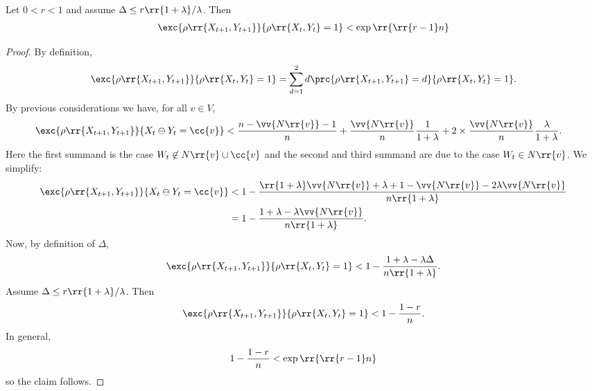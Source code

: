 \documentclass{article}
\begin{document}
\begin{claim*}[4]
  Let $0<r<1$ and assume $\Delta \leq r\rr{1+\lambda}/\lambda$. Then
  \begin{align*}
    \exc{\rho\rr{X_{t+1},Y_{t+1}}}{\rho\rr{X_t,Y_t}=1} < \exp\rr{\rr{r-1}n}
  \end{align*}
  \begin{proof}
    By definition,
    \begin{align*}
      \exc{\rho\rr{X_{t+1},Y_{t+1}}}{\rho\rr{X_t,Y_t}=1} = \sum_{d=1}^{2} d\prc{\rho\rr{X_{t+1},Y_{t+1}}=d}{\rho\rr{X_t,Y_t}=1}.
    \end{align*}
    By previous considerations we have, for all $v\in V$,
    \begin{align*}
      \exc{\rho\rr{X_{t+1},Y_{t+1}}}{X_t\ominus Y_t=\cc{v}}
      &< \frac{n-\vv{N\rr{v}}-1}{n}
      + \frac{\vv{N\rr{v}}}{n}\frac{1}{1+\lambda}
      + 2\times\frac{\vv{N\rr{v}}}{n} \frac{\lambda}{1+\lambda}.
    \end{align*}
    Here the first summand is the case $W_t\not\in N\rr{v}\cup \cc{v}$ and the second and third summand are
    due to the case $W_t\in N\rr{v}$. We simplify:
    \begin{align*}
      \exc{\rho\rr{X_{t+1},Y_{t+1}}}{X_t\ominus Y_t=\cc{v}}
      &< 1 - \frac{\rr{1+\lambda}\vv{N\rr{v}}+\lambda + 1 - \vv{N\rr{v}}-2\lambda \vv{N\rr{v}}}{n\rr{1+\lambda}}\\
      &= 1 - \frac{1+\lambda -\lambda \vv{N\rr{v}}}{n\rr{1+\lambda}}.
    \end{align*}
    Now, by definition of $\Delta$,
    \begin{align*}
      \exc{\rho\rr{X_{t+1},Y_{t+1}}}{\rho\rr{X_t,Y_t}=1} < 1 - \frac{1+\lambda - \lambda\Delta}{n\rr{1+\lambda}}.
    \end{align*}
    Assume $\Delta\leq r\rr{1+\lambda}/\lambda$. Then
    \begin{align*}
      \exc{\rho\rr{X_{t+1},Y_{t+1}}}{\rho\rr{X_t,Y_t}=1} < 1 - \frac{1-r}{n}.
    \end{align*}
    In general,
    \begin{align*}
      1 - \frac{1-r}{n} < \exp\rr{\rr{r-1}n}
    \end{align*}
    so the claim follows.
  \end{proof}
\end{claim*}
\end{document}
